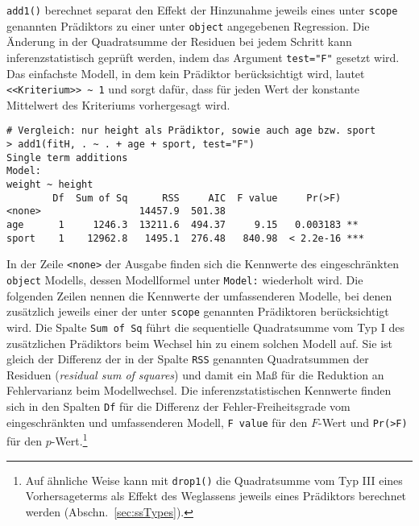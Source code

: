 \lstinline!add1()! berechnet separat den Effekt der Hinzunahme jeweils eines unter \lstinline!scope! genannten Prädiktors zu einer unter \lstinline!object! angegebenen Regression. Die Änderung in der Quadratsumme der Residuen bei jedem Schritt kann inferenzstatistisch geprüft werden, indem das Argument \lstinline!test="F"! gesetzt wird. Das einfachste Modell, in dem kein Prädiktor berücksichtigt wird, lautet \lstinline!<<Kriterium>> ~ 1! und sorgt dafür, dass für jeden Wert der konstante Mittelwert des Kriteriums vorhergesagt wird.
\begin{lstlisting}
# Vergleich: nur height als Prädiktor, sowie auch age bzw. sport
> add1(fitH, . ~ . + age + sport, test="F")
Single term additions
Model:
weight ~ height
        Df  Sum of Sq      RSS     AIC  F value     Pr(>F)
<none>                 14457.9  501.38
age      1     1246.3  13211.6  494.37     9.15   0.003183 **
sport    1    12962.8   1495.1  276.48   840.98  < 2.2e-16 ***
\end{lstlisting}

In der Zeile \lstinline!<none>! der Ausgabe finden sich die Kennwerte des eingeschränkten \lstinline!object! Modells, dessen Modellformel unter \lstinline!Model:! wiederholt wird. Die folgenden Zeilen nennen die Kennwerte der umfassenderen Modelle, bei denen zusätzlich jeweils einer der unter \lstinline!scope! genannten Prädiktoren berücksichtigt wird. Die Spalte \lstinline!Sum of Sq! führt die sequentielle Quadratsumme vom Typ I des zusätzlichen Prädiktors beim Wechsel hin zu einem solchen Modell auf. Sie ist gleich der Differenz der in der Spalte \lstinline!RSS! genannten Quadratsummen der Residuen (\emph{residual sum of squares}) und damit ein Maß für die Reduktion an Fehlervarianz beim Modellwechsel. Die inferenzstatistischen Kennwerte finden sich in den Spalten \lstinline!Df! für die Differenz der Fehler-Freiheitsgrade vom eingeschränkten und umfassenderen Modell, \lstinline!F value! für den $F$-Wert und \lstinline!Pr(>F)! für den $p$-Wert.\footnote{Auf ähnliche Weise kann mit \lstinline!drop1()! die Quadratsumme vom Typ III eines Vorhersageterms als Effekt des Weglassens jeweils eines Prädiktors berechnet werden (Abschn.\ \ref{sec:ssTypes}).}

